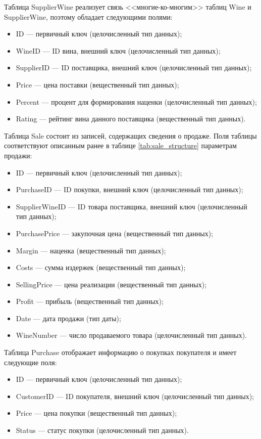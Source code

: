 Таблица SupplierWine реализует связь <<многие-ко-многим>> таблиц Wine и SupplierWine, поэтому обладает следующими полями:
\begin{itemize}
	\item ID --- первичный ключ (целочисленный тип данных);
	\item WineID --- ID вина, внешний ключ (целочисленный тип данных);
	\item SupplierID --- ID поставщика, внешний ключ (целочисленный тип данных);
	\item Price --- цена поставки (вещественный тип данных);
	\item Percent --- процент для формирования наценки (целочисленный тип данных);
	\item Rating --- рейтинг вина данного поставщика (вещественный тип данных).
\end{itemize}

Таблица Sale состоит из записей, содержащих сведения о продаже. Поля таблицы соответствуют описанным ранее в таблице \ref{tab:sale_structure} параметрам продажи:
\begin{itemize}
	\item ID --- первичный ключ (целочисленный тип данных);
	\item PurchaseID --- ID покупки, внешний ключ (целочисленный тип данных);
	\item SupplierWineID --- ID товара поставщика, внешний ключ (целочисленный тип данных);
	\item PurchasePrice --- закупочная цена (вещественный тип данных);
	\item Margin --- наценка (вещественный тип данных);
	\item Costs --- сумма издержек (вещественный тип данных);
	\item SellingPrice --- цена реализации (вещественный тип данных);
	\item Profit --- прибыль (вещественный тип данных);
	\item Date --- дата продажи (тип даты);
	\item WineNumber --- число продаваемого товара (целочисленный тип данных).
\end{itemize}

Таблица Purchase отображает информацию о покупках покупателя и имеет следующие поля:
\begin{itemize}
	\item ID --- первичный ключ (целочисленный тип данных);
	\item CustomerID --- ID покупателя, внешний ключ (целочисленный тип данных);
	\item Price --- цена покупки (вещественный тип данных);
	\item Status --- статус покупки (целочисленный тип данных).
\end{itemize}

